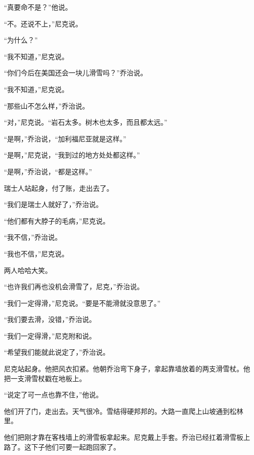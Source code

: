 “真要命不是？”他说。

“不。还说不上，”尼克说。

“为什么？”

“我不知道，”尼克说。

“你们今后在美国还会一块儿滑雪吗？”乔治说。

“我不知道，”尼克说。

“那些山不怎么样，”乔治说。

“对，”尼克说。“岩石太多。树木也太多，而且都太远。”

“是啊，”乔治说，“加利福尼亚就是这样。”

“是啊，”尼克说，“我到过的地方处处都这样。”

“是啊，”乔治说，“都是这样。”

瑞士人站起身，付了账，走出去了。

“我们是瑞士人就好了，”乔治说。

“他们都有大脖子的毛病，”尼克说。

“我不信，”乔治说。

“我也不信，”尼克说。

两人哈哈大笑。

“也许我们再也没机会滑雪了，尼克，”乔治说。

“我们一定得滑，”尼克说。“要是不能滑就没意思了。”

“我们要去滑，没错，”乔治说。

“我们一定得滑，”尼克附和说。

“希望我们能就此说定了，”乔治说。

尼克站起身。他把风衣扣紧。他朝乔治弯下身子，拿起靠墙放着的两支滑雪杖。他把一支滑雪杖戳在地板上。

“说定了可一点也靠不住，”他说。

他们开了门，走出去。天气很冷。雪结得硬邦邦的。大路一直爬上山坡通到松林里。

他们把刚才靠在客栈墙上的滑雪板拿起来。尼克戴上手套。乔治已经扛着滑雪板上路了。这下子他们可要一起跑回家了。